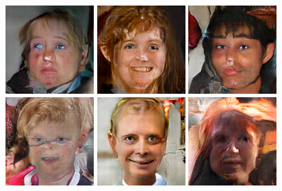\begin{figure}[!h]
{    }
    \vspace{0.1cm}
    \centerline{
        \includegraphics[scale=0.485]{figures/ffhq/random/ffhq128x128_image0015.png}
        \includegraphics[scale=0.485]{figures/ffhq/random/ffhq128x128_image0016.png}
        \includegraphics[scale=0.485]{figures/ffhq/random/ffhq128x128_image0017.png}
        \includegraphics[scale=0.485]{figures/ffhq/random/ffhq128x128_image0018.png}
        \includegraphics[scale=0.485]{figures/ffhq/random/ffhq128x128_image0019.png}
        \includegraphics[scale=0.485]{figures/ffhq/random/ffhq128x128_image0020.png}
}
\end{figure}
